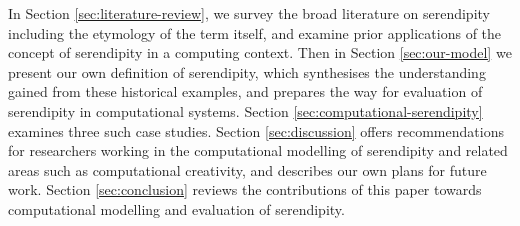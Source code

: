 In Section \ref{sec:literature-review}, we survey the broad literature
on serendipity including the etymology of the term itself, and examine
prior applications of the concept of serendipity in a computing
context.  Then in Section \ref{sec:our-model} we present our own
definition of serendipity, which synthesises the understanding gained
from these historical examples, and prepares the way for evaluation of
serendipity in computational systems.  Section
\ref{sec:computational-serendipity} examines three such case studies.
Section \ref{sec:discussion} offers recommendations for researchers
working in the computational modelling of serendipity and related
areas such as computational creativity, and describes our own plans
for future work.  Section \ref{sec:conclusion} reviews the
contributions of this paper towards computational modelling and
evaluation of serendipity.


